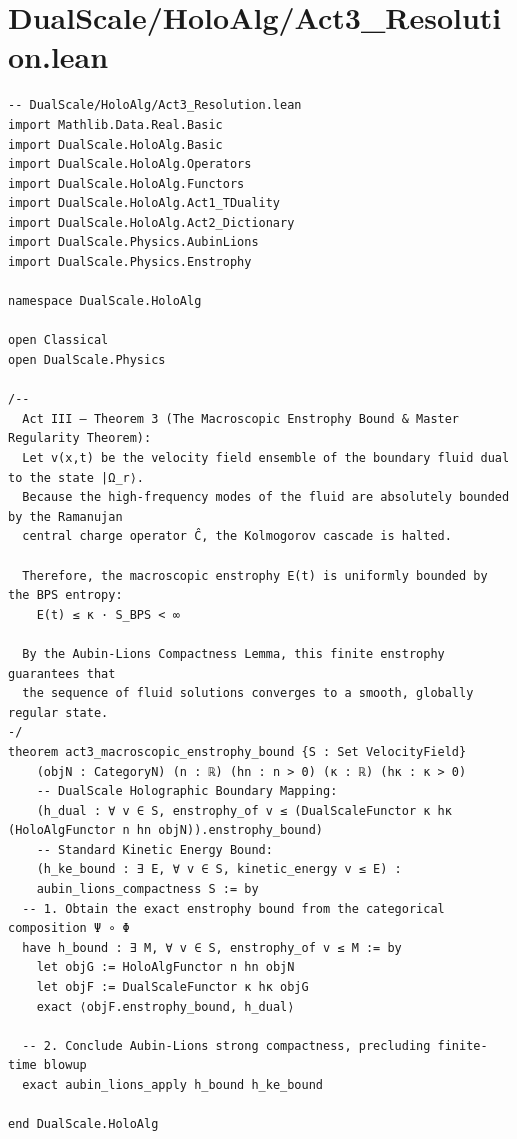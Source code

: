 \documentclass[11pt,twoside,openright]{book}
\begin{document}
\section{DualScale/HoloAlg/Act3\_Resolution.lean}
\begin{verbatim}
-- DualScale/HoloAlg/Act3_Resolution.lean
import Mathlib.Data.Real.Basic
import DualScale.HoloAlg.Basic
import DualScale.HoloAlg.Operators
import DualScale.HoloAlg.Functors
import DualScale.HoloAlg.Act1_TDuality
import DualScale.HoloAlg.Act2_Dictionary
import DualScale.Physics.AubinLions
import DualScale.Physics.Enstrophy

namespace DualScale.HoloAlg

open Classical
open DualScale.Physics

/--
  Act III — Theorem 3 (The Macroscopic Enstrophy Bound & Master Regularity Theorem):
  Let v(x,t) be the velocity field ensemble of the boundary fluid dual to the state |Ω_r⟩.
  Because the high-frequency modes of the fluid are absolutely bounded by the Ramanujan 
  central charge operator Ĉ, the Kolmogorov cascade is halted.
  
  Therefore, the macroscopic enstrophy E(t) is uniformly bounded by the BPS entropy:
    E(t) ≤ κ · S_BPS < ∞
  
  By the Aubin-Lions Compactness Lemma, this finite enstrophy guarantees that 
  the sequence of fluid solutions converges to a smooth, globally regular state.
-/
theorem act3_macroscopic_enstrophy_bound {S : Set VelocityField}
    (objN : CategoryN) (n : ℝ) (hn : n > 0) (κ : ℝ) (hκ : κ > 0)
    -- DualScale Holographic Boundary Mapping:
    (h_dual : ∀ v ∈ S, enstrophy_of v ≤ (DualScaleFunctor κ hκ (HoloAlgFunctor n hn objN)).enstrophy_bound)
    -- Standard Kinetic Energy Bound:
    (h_ke_bound : ∃ E, ∀ v ∈ S, kinetic_energy v ≤ E) :
    aubin_lions_compactness S := by
  -- 1. Obtain the exact enstrophy bound from the categorical composition Ψ ∘ Φ
  have h_bound : ∃ M, ∀ v ∈ S, enstrophy_of v ≤ M := by
    let objG := HoloAlgFunctor n hn objN
    let objF := DualScaleFunctor κ hκ objG
    exact ⟨objF.enstrophy_bound, h_dual⟩

  -- 2. Conclude Aubin-Lions strong compactness, precluding finite-time blowup
  exact aubin_lions_apply h_bound h_ke_bound

end DualScale.HoloAlg

\end{verbatim}
\end{document}
